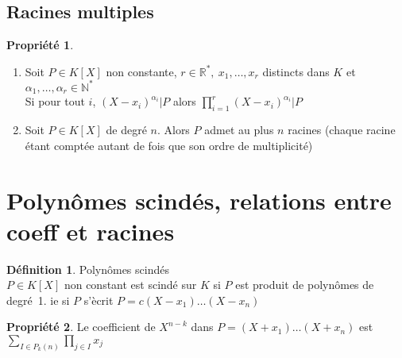 \documentclass[fleqn]{article}
\theoremstyle{definition} \newtheorem*{defi}{D\'efinition}
\theoremstyle{definition} \newtheorem*{theo}{Th\'eor\`eme}
\theoremstyle{definition} \newtheorem*{coro}{Corollaire}
\theoremstyle{definition} \newtheorem*{nota}{Notation}
\theoremstyle{remark} \newtheorem*{rqs}{Remarques}
\theoremstyle{definition} \newtheorem*{prop}{Propri\'et\'e}
\begin{document}
\subsection{Racines multiples}

\begin{prop} $ $
	\begin{enumerate}
		\item Soit $P \in K[X]$ non constante, $r \in \mathbb{R}^*,\ x_1, \hdots, x_r$ distincts dans $K$ et $\alpha_1, \hdots, \alpha_r \in
		\mathbb{N}^*$\\
		Si pour tout $i$, $(X-x_i)^{\alpha_i} | P$ alors $\prod_{i=1}^r (X - x_i)^{\alpha_i} | P$
		\item Soit $P\in K[X]$ de degr\'e $n$. Alors $P$ admet au plus $n$ racines (chaque racine \'etant compt\'ee autant de fois que son ordre
		de multiplicit\'e)
	\end{enumerate}
\end{prop}

\section{Polyn\^omes scind\'es, relations entre coeff et racines}
\begin{defi} Polyn\^omes scind\'es \\
	$P \in K[X]$ non constant est scind\'e sur $K$ si $P$ est produit de polyn\^omes de \mbox{degr\'e 1.}
	ie si $P$ s'\`ecrit $P = c(X-x_1)\hdots(X-x_n)$
\end{defi}

\begin{prop}
	Le coefficient de $X^{n-k}$ dans $P = (X+x_1) \hdots (X + x_n)$ est $\sum_{I \in P_k(n)} \prod_{j \in I} x_j$
\end{prop}

\end{document}
